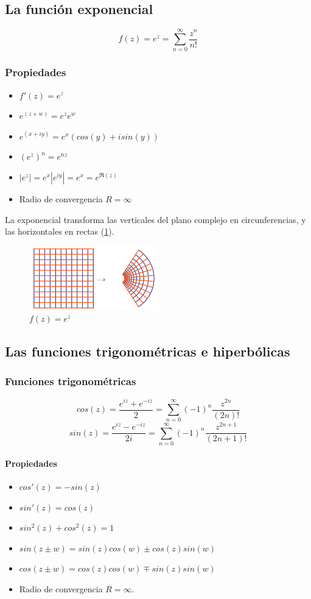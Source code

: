 \documentclass[paper=a4, fontsize=11pt]{scrartcl}
\numberwithin{equation}{section}
\numberwithin{figure}{section}
\numberwithin{table}{section}
\begin{document}
\subsection{La función exponencial}
$$f(z) = e^z = \sum_{n=0}^\infty \frac{z^n}{n!}$$

\subsubsection{Propiedades}
\begin{itemize}
\item $f'(z) = e^z$
\item $e^{(z+w)}=e^ze^w$
\item $e^{(x+iy)}=e^x(cos(y)+isin(y))$
\item $(e^z)^n=e^{nz}$
\item $|e^z| = e^x|e^{iy}|=e^x= e^{\Re(z)}$
\item Radio de convergencia $R=\infty$
\end{itemize}

La exponencial transforma las verticales del plano complejo en circunferencias, y las horizontales en rectas (\ref{fig:exp}).
\begin{figure}[htbp]
\centering
\includegraphics[width=0.5\textwidth]{exp.png}
\caption{$f(z)=e^z$}
\label{fig:exp}
\end{figure}


\subsection{Las funciones trigonométricas e hiperbólicas}
\subsubsection{Funciones trigonométricas}

$$cos(z) = \frac{e^{iz}+e^{-{iz}}}{2} = \sum_{n=0}^\infty(-1)^n\frac{z^{2n}}{(2n)!}$$
$$sin(z) = \frac{e^{iz}-e^{-{iz}}}{2i} = \sum_{n=0}^\infty(-1)^n\frac{z^{2n+1}}{(2n+1)!}$$

\paragraph{Propiedades}
\begin{itemize}
\item $cos'(z) = -sin(z)$
\item $sin'(z) = cos(z)$
\item $sin^2(z)+cos^2(z) = 1$
\item $sin(z\pm w) = sin(z)cos(w)\pm cos(z)sin(w)$
\item $cos(z\pm w) = cos(z)cos(w)\mp sin(z)sin(w)$
\item Radio de convergencia $R=\infty$.
\end{itemize}
\end{document}
